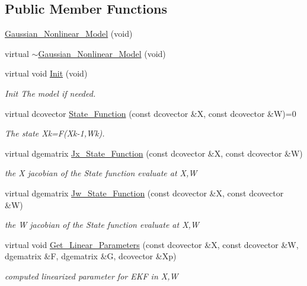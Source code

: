 \subsection*{Public Member Functions}
\begin{CompactItemize}
\item 
\hyperlink{class_gaussian___nonlinear___model_59d94561c9b95d4b510f244a198c29a0}{Gaussian\_\-Nonlinear\_\-Model} (void)
\item 
virtual \hyperlink{class_gaussian___nonlinear___model_35fe0f1156e0d0e687937df527aea1e0}{$\sim$Gaussian\_\-Nonlinear\_\-Model} (void)
\item 
virtual void \hyperlink{class_gaussian___nonlinear___model_146f819d0aeea0dc59b86e9af200e0bd}{Init} (void)
\begin{CompactList}\small\item\em Init The model if needed. \item\end{CompactList}\item 
virtual dcovector \hyperlink{class_gaussian___nonlinear___model_df0e6cf50a8d5fdb6decd05046867cd8}{State\_\-Function} (const dcovector \&X, const dcovector \&W)=0
\begin{CompactList}\small\item\em The state Xk=F(Xk-1,Wk). \item\end{CompactList}\item 
virtual dgematrix \hyperlink{class_gaussian___nonlinear___model_ad4a587fcaab06d2d9e44d61cee814cf}{Jx\_\-State\_\-Function} (const dcovector \&X, const dcovector \&W)
\begin{CompactList}\small\item\em the X jacobian of the State function evaluate at X,W \item\end{CompactList}\item 
virtual dgematrix \hyperlink{class_gaussian___nonlinear___model_1c6710cedf6317e07b7b2a48f41f5442}{Jw\_\-State\_\-Function} (const dcovector \&X, const dcovector \&W)
\begin{CompactList}\small\item\em the W jacobian of the State function evaluate at X,W \item\end{CompactList}\item 
virtual void \hyperlink{class_gaussian___nonlinear___model_c850a678b4672e4358d3f29d7b998549}{Get\_\-Linear\_\-Parameters} (const dcovector \&X, const dcovector \&W, dgematrix \&F, dgematrix \&G, dcovector \&Xp)
\begin{CompactList}\small\item\em computed linearized parameter for EKF in X,W \item\end{CompactList}\end{CompactItemize}


